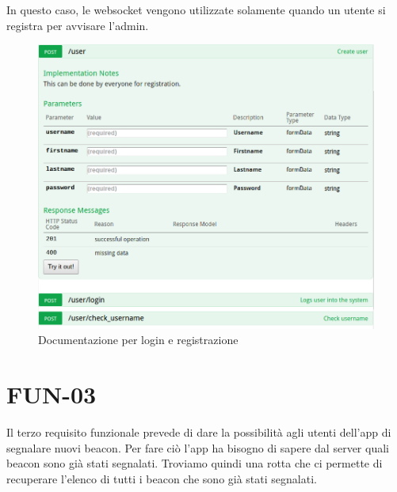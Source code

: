 In questo caso, le websocket vengono utilizzate solamente quando un utente si registra per avvisare l'admin.

\begin{figure}[h]
\centering
\includegraphics[width=1\textwidth]{API/user_02.png} 
\caption{Documentazione per login e registrazione}
\label{fig:user:login}
\end{figure}

\section{FUN-03}
Il terzo requisito funzionale prevede di dare la possibilità agli utenti dell'app di segnalare nuovi beacon.
Per fare ciò l'app ha bisogno di sapere dal server quali beacon sono già stati segnalati.
Troviamo quindi una rotta che ci permette di recuperare l'elenco di tutti i beacon che sono già stati segnalati.

